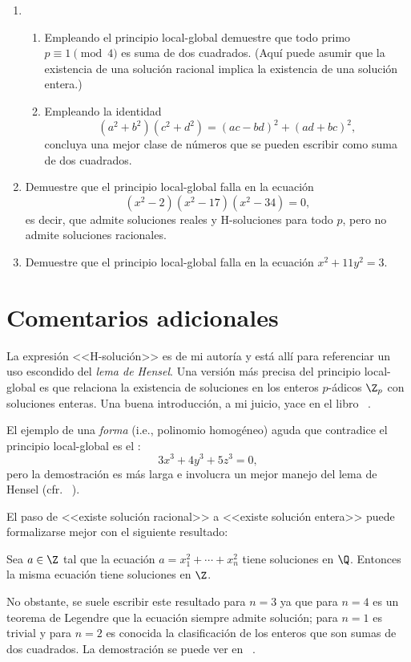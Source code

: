 \documentclass[11pt, reqno]{amsart}
\begin{document}
\begin{enumerate}[resume]
	\item 
		\begin{enumerate}
			\item Empleando el principio local-global demuestre que todo primo $p \equiv 1 \pmod 4$ es suma de dos cuadrados.
				(Aquí puede asumir que la existencia de una solución racional implica la existencia de una solución entera.)
			\item Empleando la identidad
				\begin{equation}
					(a^2 + b^2)(c^2 + d^2) = (ac - bd)^2 + (ad + bc)^2,
					\label{eqn:two_squares}
				\end{equation}
				concluya una mejor clase de números que se pueden escribir como suma de dos cuadrados.
		\end{enumerate}
	\item Demuestre que el principio local-global falla en la ecuación
		$$ (x^2 - 2)(x^2 - 17)(x^2 - 34) = 0, $$
		es decir, que admite soluciones reales y H-soluciones para todo $p$, pero no admite soluciones racionales.
	\item Demuestre que el principio local-global falla en la ecuación $x^2 + 11y^2 = 3$.
\end{enumerate}

\section{Comentarios adicionales}
La expresión <<H-solución>> es de mi autoría y está allí para referenciar un uso escondido del \textit{lema de Hensel}.
Una versión más precisa del principio local-global es que relaciona la existencia de soluciones en los enteros $p$-ádicos $\Z_p$ con soluciones enteras.
Una buena introducción, a mi juicio, yace en el libro \citeauthor{cassels:local_fields}~\cite{cassels:local_fields}.

El ejemplo de una \textit{forma} (i.e., polinomio homogéneo) aguda que contradice el principio local-global es el :
$$ 3x^3 + 4y^3 + 5z^3 = 0, $$
pero la demostración es más larga e involucra un mejor manejo del lema de Hensel (cfr. \citeauthor{conrad:local_global}~\cite{conrad:local_global}).

El paso de <<existe solución racional>> a <<existe solución entera>> puede formalizarse mejor con el siguiente resultado:
\begin{lem}
	Sea $a \in \Z$ tal que la ecuación $a = x_1^2 + \cdots + x_n^2$ tiene soluciones en $\Q$.
	Entonces la misma ecuación tiene soluciones en $\Z$.
\end{lem}
No obstante, se suele escribir este resultado para $n = 3$ ya que para $n = 4$ es un teorema de Legendre que la ecuación siempre admite solución;
para $n = 1$ es trivial y para $n = 2$ es conocida la clasificación de los enteros que son sumas de dos cuadrados.
La demostración se puede ver en \citeauthor{rajwade:squares}~\cite{rajwade:squares}.
\end{document}
